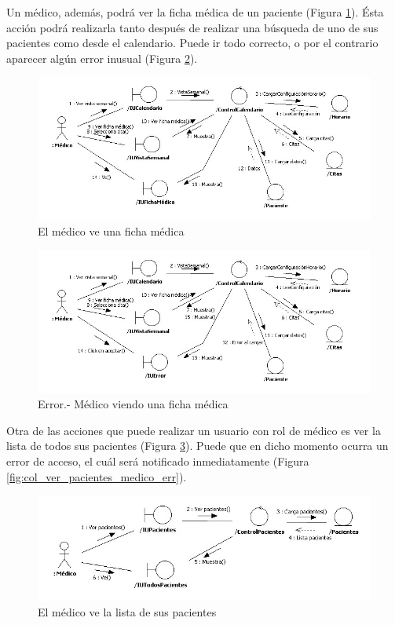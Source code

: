 \documentclass[a4paper,oneside,11pt]{book}
\begin{document}
			Un médico, además, podrá ver la ficha médica de un paciente (Figura \ref{fig:col_verficha_medico}). Ésta acción podrá realizarla tanto después de realizar una búsqueda de uno de sus pacientes como desde el calendario. Puede ir todo correcto, o por el contrario aparecer algún error inusual (Figura \ref{fig:col_verficha_medico_err}).
			
			\begin{figure}[H]
			  \centering
			    \includegraphics[width=16cm]{img/jpg/colaboraciones/11_VerFichaMedica.jpg}
			  \caption{El médico ve una ficha médica}
			  \label{fig:col_verficha_medico}
			\end{figure}
			
			\begin{figure}[H]
			  \centering
			    \includegraphics[width=16cm]{img/jpg/colaboraciones/12_VerFichaMedicaError.jpg}
			  \caption{Error.- Médico viendo una ficha médica}
			  \label{fig:col_verficha_medico_err}
			\end{figure}
			
			Otra de las acciones que puede realizar un usuario con rol de médico es ver la lista de todos sus pacientes (Figura \ref{fig:col_ver_pacientes_medico}). Puede que en dicho momento ocurra un error de acceso, el cuál será notificado inmediatamente (Figura \ref{fig:col_ver_pacientes_medico_err}).
			
			\begin{figure}[H]
			  \centering
			    \includegraphics[width=16cm]{img/jpg/colaboraciones/13_VerTodosPacientes.jpg}
			  \caption{El médico ve la lista de sus pacientes}
			  \label{fig:col_ver_pacientes_medico}
			\end{figure}
			
\end{document}
